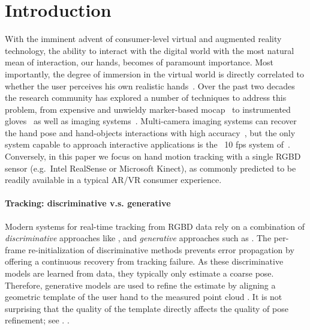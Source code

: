 % 
% 
% 
% 



\section{Introduction}
With the imminent advent of consumer-level virtual and augmented reality technology, the ability to interact with the digital world with the most natural mean of interaction, our hands, becomes of paramount importance. Most importantly, the degree of immersion in the virtual world is directly correlated to whether the user perceives his own realistic hands~. Over the past two decades the research community has explored a number of techniques to address this problem, from expensive and unwieldy marker-based mocap~ to instrumented gloves~\cite{dipietro2008survey} as well as imaging systems~\cite{erol2007survey}. Multi-camera imaging systems can recover the hand pose and hand-objects interactions with high accuracy~\cite{ballan2013salient}, but the only system capable to approach interactive applications is the ~10 fps system of~\cite{sridhar2013multicam}. Conversely, in this paper we focus on hand motion tracking with a single RGBD sensor (e.g.\ Intel RealSense or Microsoft Kinect), as commonly predicted to be readily available in a typical AR/VR consumer experience.

\paragraph{Tracking: discriminative v.s. generative}
Modern systems for real-time tracking from RGBD data  \cite{sridhar2015fast,sharp2015accurate} rely on a combination of \emph{discriminative} approaches like \cite{oberweger2015feedback}, and \emph{generative} approaches such as \cite{tagliasacchi2015robust}. The per-frame re-initialization of discriminative methods prevents error propagation by offering a continuous recovery from tracking failure. As these discriminative models are learned from data, they typically only estimate a coarse pose. Therefore, generative models are used to refine the estimate by aligning a geometric template of the user hand to the measured point cloud . It is not surprising that the quality of the template directly affects the quality of pose refinement; see . 
.

